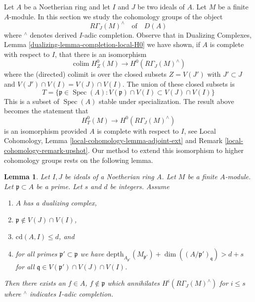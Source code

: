 \documentclass[10pt,a4paper]{amsart}
\theoremstyle{plain}
\newtheorem{lemma}[subsection]{Lemma}
\theoremstyle{definition}
\theoremstyle{remark}
\numberwithin{equation}{subsection}
\def\colim{\mathop{\mathrm{colim}}\nolimits}
\def\Spec{\mathop{\mathrm{Spec}}}
\begin{document}
\noindent
Let $A$ be a Noetherian ring and let $I$ and $J$ be two ideals of $A$.
Let $M$ be a finite $A$-module. In this section we study the
cohomology groups of the object
$$
R\Gamma_J(M)^\wedge
\quad\text{of}\quad
D(A)
$$
where ${}^\wedge$ denotes derived $I$-adic completion. Observe that in
Dualizing Complexes, Lemma \ref{dualizing-lemma-completion-local-H0}
we have shown, if $A$ is complete with respect to $I$,
that there is an isomorphism
$$
\colim H^0_Z(M) \longrightarrow H^0(R\Gamma_J(M)^\wedge)
$$
where the (directed) colimit is over the closed subsets $Z = V(J')$
with $J' \subset J$ and $V(J') \cap V(I) = V(J) \cap V(I)$.
The union of these closed subsets is
\begin{equation}
\label{equation-associated-subset}
T = \{\mathfrak p \in \Spec(A) :
V(\mathfrak p) \cap V(I) \subset V(J) \cap V(I)\}
\end{equation}
This is a subset of $\Spec(A)$ stable under specialization.
The result above becomes the statement that
$$
H^0_T(M) \longrightarrow H^0(R\Gamma_J(M)^\wedge)
$$
is an isomorphism provided $A$ is complete with respect to $I$, see
Local Cohomology, Lemma \ref{local-cohomology-lemma-adjoint-ext} and
Remark \ref{local-cohomology-remark-upshot}.
Our method to extend this isomorphism to higher cohomology groups
rests on the following lemma.

\begin{lemma}
\label{lemma-kill-completion-general}
Let $I, J$ be ideals of a Noetherian ring $A$.
Let $M$ be a finite $A$-module. Let $\mathfrak p \subset A$ be a prime.
Let $s$ and $d$ be integers. Assume
\begin{enumerate}
\item $A$ has a dualizing complex,
\item $\mathfrak p \not \in V(J) \cap V(I)$,
\item $\text{cd}(A, I) \leq d$, and
\item for all primes $\mathfrak p' \subset \mathfrak p$
we have
$\text{depth}_{A_{\mathfrak p'}}(M_{\mathfrak p'}) +
\dim((A/\mathfrak p')_\mathfrak q) > d + s$
for all $\mathfrak q \in V(\mathfrak p') \cap V(J) \cap V(I)$.
\end{enumerate}
Then there exists an $f \in A$, $f \not \in \mathfrak p$ which annihilates
$H^i(R\Gamma_J(M)^\wedge)$ for $i \leq s$ where ${}^\wedge$
indicates $I$-adic completion.
\end{lemma}
\end{document}
